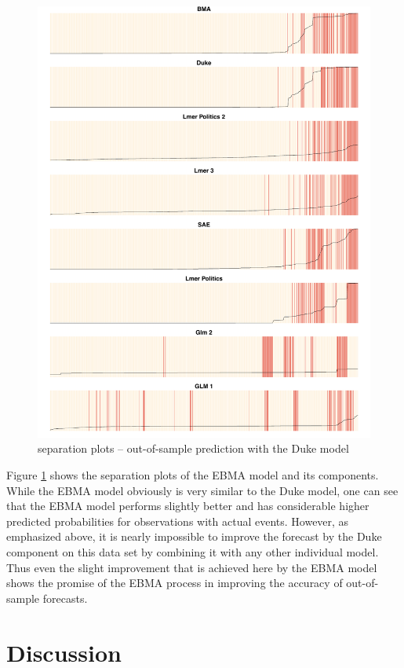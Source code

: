 \documentclass[pdftex,12pt,fullpage,oneside]{amsart}
\begin{document}
\begin{figure}[ht!]
\caption{separation plots -- out-of-sample prediction with the
Duke model}
\label{OutSam2sep}
\includegraphics[width=6.2 in]{Plots_Outsample}
\end{figure}

Figure \ref{OutSam2sep} shows the separation plots of the EBMA model
and its components.  While the EBMA model obviously
is very similar to the Duke model, one can see that the EBMA model
performs slightly better and has considerable higher predicted
probabilities for observations with actual events.  However, as
emphasized above, it is nearly impossible to improve the forecast by
the Duke component on this data set by combining it with any other
individual model. Thus even the slight improvement that is achieved
here by the EBMA model shows the promise of the EBMA
process in improving the accuracy of out-of-sample forecasts.

\section{Discussion}
\end{document}
